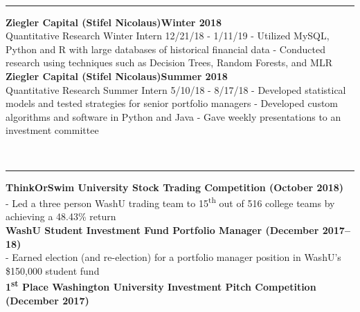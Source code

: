 \documentclass[12pt]{article}
\begin{document}
\begin{titlepage}
\begin{addmargin}[1em]{0em}
\begin{center}
\begin{minipage}[b]{0.3\textwidth}
				\end{minipage}
			\end{center}
		\end{addmargin}
		\vspace{-10pt}
		\noindent
		\\\rule{\textwidth}{0.4pt}
		\begin{addmargin}[1em]{0em}
			\textbf{Ziegler Capital (Stifel Nicolaus)\hfill Winter 2018}\\
Quantitative Research Winter Intern \hfill {\small{12/21/18 - 1/11/19}}\newline
- Utilized MySQL, Python and R with large databases of historical financial data \newline
- Conducted research using techniques such as Decision Trees, Random Forests, and MLR\newline
			\textbf{Ziegler Capital (Stifel Nicolaus)\hfill Summer 2018}\\
Quantitative Research Summer Intern \hfill {\small{5/10/18 - 8/17/18}}\newline
- Developed statistical models and tested strategies for senior portfolio managers\newline
- Developed custom algorithms and software in Python and Java\newline
- Gave weekly presentations to an investment committee\newline
		\end{addmargin}
		\vspace{-10pt}
		\noindent
		\\\rule{\textwidth}{0.4pt}
		\begin{addmargin}[1em]{0em}
			\textbf{ThinkOrSwim University Stock Trading Competition \hfill (October 2018)}\\
- Led a three person WashU trading team to 15\textsuperscript{th} out of 516 college teams by achieving a 48.43\% return\\
			\textbf{WashU Student Investment Fund Portfolio Manager \hfill (December 2017–18)}\\
- Earned election (and re-election) for a portfolio manager position in WashU's \$150,000 student fund\\
			\textbf{1\textsuperscript{st} Place Washington University Investment Pitch Competition \hfill (December 2017)}\\

\end{addmargin}
\end{titlepage}
\end{document}
